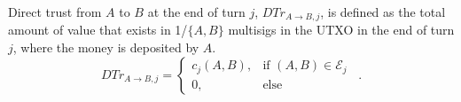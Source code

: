 {}
\begin{definition}
  Direct trust from $A$ to $B$ at the end of turn $j$, $DTr_{A \rightarrow B, j}$, is defined as the total amount of
  value that exists in 1/$\{A,B\}$ multisigs in the UTXO in the end of turn $j$, where the money is deposited by $A$.
  \begin{equation}
    DTr_{A \rightarrow B, j} =
      \begin{cases}
        c_j\left(A, B\right), & \mbox{if } \left(A, B\right) \in \mathcal{E}_j \\
        0, & \mbox{else}
      \end{cases} \enspace .
  \end{equation}
\end{definition}
